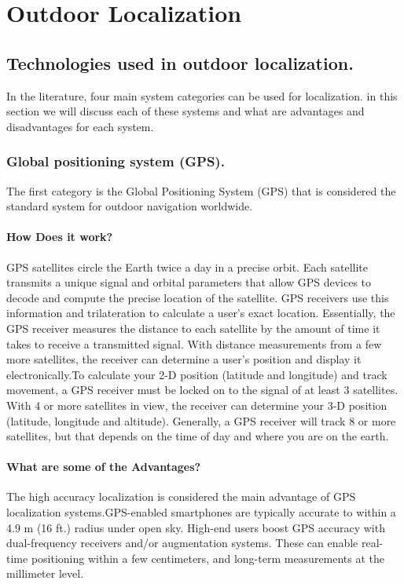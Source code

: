 \chapter{Outdoor Localization}
\section{Technologies used in outdoor localization.}
 In the literature, four main system categories can be used for localization. in this section we will discuss each of these systems and what are advantages and disadvantages for each system.
\subsection{Global positioning system (GPS).}
The first category is the Global Positioning System (GPS) that is considered the standard system for outdoor navigation worldwide.\cite{6295661}
\subsubsection{How Does it work?}
GPS satellites circle the Earth twice a day in a precise orbit. Each satellite transmits a unique signal and orbital parameters that allow GPS devices to decode and compute the precise location of the satellite. GPS receivers use this information and trilateration to calculate a user's exact location. Essentially, the GPS receiver measures the distance to each satellite by the amount of time it takes to receive a transmitted signal. With distance measurements from a few more satellites, the receiver can determine a user's position and display it electronically.To calculate your 2-D position (latitude and longitude) and track movement, a GPS receiver must be locked on to the signal of at least 3 satellites. With 4 or more satellites in view, the receiver can determine your 3-D position (latitude, longitude and altitude). Generally, a GPS receiver will track 8 or more satellites, but that depends on the time of day and where you are on the earth.\cite{Garmin}
\subsubsection{What are some of the Advantages?}
 The high accuracy localization is considered the main advantage of GPS localization systems.GPS-enabled smartphones are typically accurate to within a 4.9 m (16 ft.) radius under open sky. High-end users boost GPS accuracy with dual-frequency receivers and/or augmentation systems. These can enable real-time positioning within a few centimeters, and long-term measurements at the millimeter level.\cite{GPS.gov}
